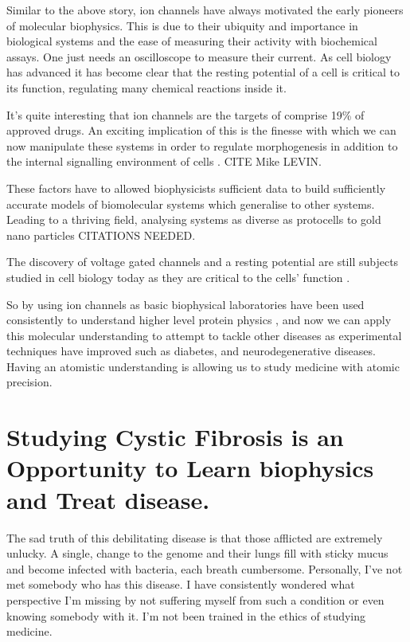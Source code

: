 Similar to the above story, ion channels have always motivated the early pioneers of molecular biophysics. This is due to their ubiquity and importance in biological systems and the ease of measuring their activity with biochemical assays. One just needs an oscilloscope to measure their current. As cell biology has advanced it has become clear that the resting potential of a cell is critical to its function, regulating many chemical reactions inside it.

It's quite interesting that ion channels are the targets of comprise 19\% of approved drugs.\cite{santos2017} An exciting implication of this is the finesse with which we can now manipulate these systems in order to regulate morphogenesis in addition to the internal signalling environment of cells \cite{}. CITE Mike LEVIN.

These factors have to allowed biophysicists sufficient data to build sufficiently accurate models of biomolecular systems which generalise to other systems. Leading to a thriving field, analysing systems as diverse as protocells to gold nano particles CITATIONS NEEDED.

The discovery of voltage gated channels and a resting potential are still subjects studied in cell biology today as they are critical to the cells' function \cite{}.

So by using ion channels as basic biophysical laboratories have been used consistently to understand higher level protein physics \cite{}, and now we can apply this molecular understanding to attempt to tackle other diseases as experimental techniques have improved such as diabetes, and neurodegenerative diseases. Having an atomistic understanding is allowing us to study medicine with atomic precision.


\section{Studying Cystic Fibrosis is an Opportunity to Learn biophysics and Treat disease.} 

The sad truth of this debilitating disease is that those afflicted are extremely unlucky. A single, change to the genome and their lungs fill with sticky mucus and become infected with bacteria, each breath cumbersome. Personally, I've not met somebody who has this disease. I have consistently wondered what perspective I'm missing by not suffering myself from such a condition or even knowing somebody with it. I'm not been trained in the ethics of studying medicine.

